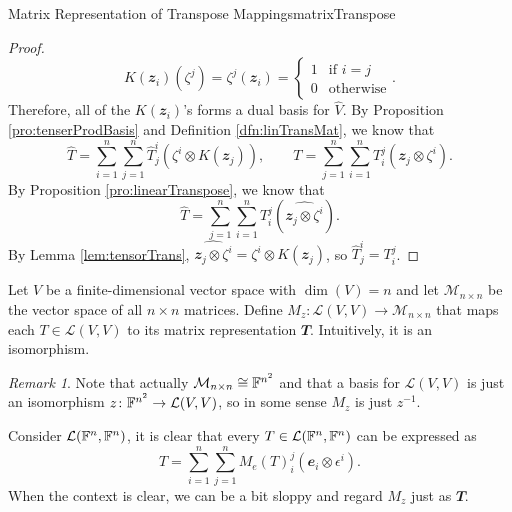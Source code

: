 \documentclass[math, code]{amznotes}
\theoremstyle{remark}
\newtheorem*{remark}{Remark}
\begin{document}
\begin{probox}{Matrix Representation of Transpose Mappings}{matrixTranspose}
\begin{proof}
        \begin{equation*}
            K(\mathbfit{z}_i)\left(\zeta^j\right) = \zeta^j(\mathbfit{z}_i) = \begin{cases}
                1 & \textrm{if } i = j \\
                0 & \textrm{otherwise}
            \end{cases}.
        \end{equation*}
        Therefore, all of the $K(\mathbfit{z}_i)$'s forms a dual basis for $\widehat{V}$. By Proposition \ref{pro:tenserProdBasis} and Definition \ref{dfn:linTransMat}, we know that 
        \begin{equation*}
            \widehat{T} = \sum_{i = 1}^{n}\sum_{j = 1}^{n}\widehat{T}^i_j\left(\zeta^i \otimes K(\mathbfit{z}_j)\right), \qquad T = \sum_{j = 1}^{n}\sum_{i = 1}^{n}T^j_i\left(\mathbfit{z}_j \otimes \zeta^i\right).
        \end{equation*}
        By Proposition \ref{pro:linearTranspose}, we know that 
        \begin{equation*}
            \widehat{T} = \sum_{j = 1}^{n}\sum_{i = 1}^{n}T^j_i\left(\widehat{\mathbfit{z}_j \otimes \zeta^i}\right).
        \end{equation*}
        By Lemma \ref{lem:tensorTrans}, $\widehat{\mathbfit{z}_j \otimes \zeta^i} = \zeta^i \otimes K(\mathbfit{z}_j)$, so $\widehat{T}^i_j = T^j_i$. 
    \end{proof}
\end{probox}
Let $V$ be a finite-dimensional vector space with $\dim(V) = n$ and let $\mathcal{M}_{n \times n}$ be the vector space of all $n \times n$ matrices. Define $M_z \colon \mathcal{L}(V, V) \to \mathcal{M}_{n \times n}$ that maps each $T \in \mathcal{L}(V, V)$ to its matrix representation $\mathbfit{T}$. Intuitively, it is an isomorphism.

\begin{notebox}
    \begin{remark}
        Note that actually $\mathcal{M}_{n \times n} \cong \mathbb{F}^{n^2}$ and that a basis for $\mathcal{L}(V, V)$ is just an isomorphism $z \colon \mathbb{F}^{n^2} \to \mathcal{L}(V, V)$, so in some sense $M_z$ is just $z^{-1}$.
    \end{remark}
\end{notebox}

Consider $\mathcal{L}(\mathbb{F}^n, \mathbb{F}^n)$, it is clear that every $T \in \mathcal{L}(\mathbb{F}^n, \mathbb{F}^n)$ can be expressed as
\begin{equation*}
    T = \sum_{i = 1}^{n}\sum_{j = 1}^{n}M_e(T)_i^j\left(\mathbfit{e}_i \otimes \epsilon^i\right).
\end{equation*}
When the context is clear, we can be a bit sloppy and regard $M_z$ just as $\mathbfit{T}$.
\end{document}
